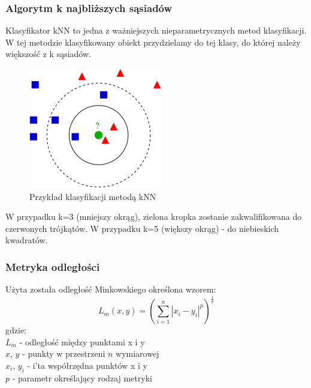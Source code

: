 \documentclass[12pt,a4paper]{article}
\begin{document}
\subsubsection*{Algorytm k najbliższych sąsiadów}
Klasyfikator kNN to jedna z ważniejszych nieparametrycznych metod klasyfikacji. W tej metodzie
klasyfikowany obiekt przydzielamy do tej klasy, do której należy większość z k sąsiadów.
\begin{figure}[!h]
	\includegraphics{"KnnClassification.png"}
	\centering
	\caption{Przykład klasyfikacji metodą kNN}
\end{figure}

W przypadku k=3 (mniejszy okrąg), zielona kropka zostanie zakwalifikowana do czerwonych
trójkątów. W przypadku k=5 (większy okrąg) - do niebieskich kwadratów.


\subsubsection*{Metryka odległości}
Użyta została odległość Minkowskiego określona wzorem:
\[
	L_m(x, y) = \left(\sum_{i = 1}^{n} |x_i - y_i|^p\right)^\frac{1}{p}
\]
gdzie: \\
\indent $L_m$ - odległość między punktami x i y\\
\indent $x$, $y$ - punkty w przestrzeni $n$ wymiarowej\\
\indent $x_i$, $y_i$ - i'ta współrzędna punktów x i y\\
\indent $p$ - parametr określający rodzaj metryki\\
\end{document}
